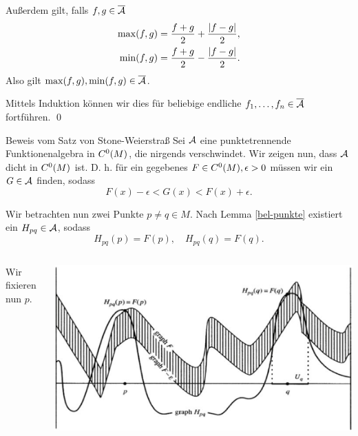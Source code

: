 \begin{frame}
    Außerdem gilt, falls \(f,g \in \overline{\mathcal{A}} \)
    \pause
    \begin{align*}
        \max(f,g) &= \frac{f+g}{2} + \frac{\left|f-g\right|}{2}, \\
        \min(f,g) &= \frac{f+g}{2} - \frac{\left|f-g\right|}{2}.
    \end{align*} 
    \pause
    Also gilt \( \max(f,g), \min(f,g) \in \overline{\mathcal{A}} \). 
    \pause

    Mittels Induktion können wir dies für beliebige endliche
    \( f_1, \ldots, f_n \in \overline{\mathcal{A}} \) fortführen.
    \qed
\end{frame}

\begin{frame}{Beweis vom Satz von Stone-Weierstraß}
    Sei \( \mathcal{A} \) eine punktetrennende Funktionenalgebra in \(C^0(M)\), die nirgends verschwindet. \pause
    Wir zeigen nun, dass \( \mathcal{A} \) dicht in \(C^0(M)\) ist. \pause
    D. h. für ein gegebenes \( F \in C^0(M), \epsilon > 0 \) 
    müssen wir ein \( G \in \mathcal{A} \) finden, sodass 
    \[ F(x) - \epsilon < G(x) < F(x) + \epsilon. \]
    \pause

    Wir betrachten nun zwei Punkte \(p\neq q \in M\).
    Nach Lemma \ref{bel-punkte} existiert ein \(H_{pq} \in \mathcal{A}\), 
    sodass 
    \[ H_{pq}(p) = F(p), \quad H_{pq}(q) = F(q). \]
\end{frame}

\begin{frame}
    \begin{columns}
        \begin{column}{0.4\textwidth}
            Wir fixieren nun \(p\).
        \end{column}
        \begin{column}{0.6\textwidth}
            \includegraphics[width=\textwidth]{images/stone-weierstrass-step1.png}
        \end{column}
    \end{columns}
\end{frame}

